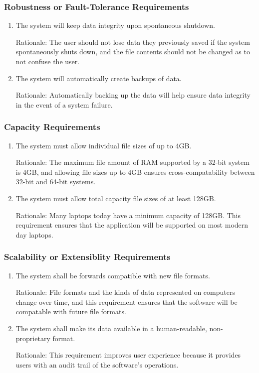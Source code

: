 \documentclass{article}
\begin{document}
\subsubsection{Robustness or Fault-Tolerance Requirements}
\begin{enumerate}[RFR1]
    \item The system will keep data integrity upon spontaneous shutdown.

	Rationale: The user should not lose data they previously saved if the system spontaneously shuts down, and the file contents should not be changed as to not confuse the user.
    \item The system will automatically create backups of data.

	Rationale: Automatically backing up the data will help ensure data integrity in the event of a system failure.
\end{enumerate}

\subsubsection{Capacity Requirements}
\begin{enumerate}[CR1]
    \item The system must allow individual file sizes of up to 4GB.

	Rationale: The maximum file amount of RAM supported by a 32-bit system is 4GB, and allowing file sizes up to 4GB ensures cross-compatability between 32-bit and 64-bit systems.
    \item The system must allow total capacity file sizes of at least 128GB.

	Rationale: Many laptops today have a minimum capacity of 128GB. This requirement ensures that the application will be supported on most modern day laptops.
\end{enumerate}

\subsubsection{Scalability or Extensiblity Requirements}
\begin{enumerate}[SER1]
    \item The system shall be forwards compatible with new file formats.

	Rationale: File formats and the kinds of data represented on computers change over time, and this requirement ensures that the software will be compatable with future file formats.
    \item The system shall make its data available in a human-readable, non-proprietary format.

	Rationale: This requirement improves user experience because it provides users with an audit trail of the software's operations.
\end{enumerate}
\end{document}
